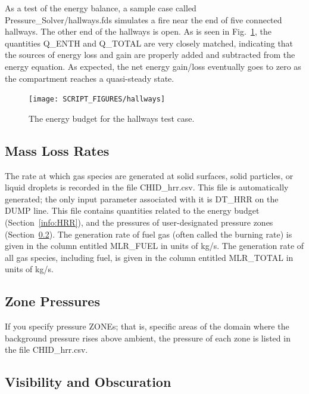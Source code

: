 \documentclass[11pt]{book}
\begin{document}
As a test of the energy balance, a sample case called {\ct Pressure\_Solver/hallways.fds} simulates a fire near the end of five connected hallways. The other end of the hallways is open. As is seen in Fig.~\ref{hallways_energy}, the quantities {\ct Q\_ENTH} and {\ct Q\_TOTAL} are very closely matched, indicating that the sources of energy loss and gain are properly added and subtracted from the energy equation. As expected, the net energy gain/loss eventually goes to zero as the compartment reaches a quasi-steady state.
\begin{figure}[ht]
\centering
\texttt{[image: SCRIPT\_FIGURES/hallways]}
\caption[Results of the {\ct hallways} test case]{The energy budget for the {\ct hallways} test case.}
\label{hallways_energy}
\end{figure}


\subsection{Mass Loss Rates}

The rate at which gas species are generated at solid surfaces, solid particles, or liquid droplets is recorded in the file {\ct CHID\_hrr.csv}. This file is automatically generated; the only input parameter associated with it is {\ct DT\_HRR} on the {\ct DUMP} line. This file contains quantities related to the energy budget (Section~\ref{info:HRR}), and the pressures of user-designated pressure zones (Section~\ref{info:pressurezone}). The generation rate of fuel gas (often called the burning rate) is given in the column entitled {\ct MLR\_FUEL} in units of kg/s. The generation rate of all gas species, including fuel, is given in the column entitled {\ct MLR\_TOTAL} in units of kg/s.


\subsection{Zone Pressures}
\label{info:pressurezone}

If you specify pressure {\ct ZONE}s; that is, specific areas of the domain where the background pressure rises above ambient, the pressure of each zone is listed in the file {\ct CHID\_hrr.csv}.


\subsection{Visibility and Obscuration}
\label{info:visibility}
\label{info:obscuration}
\end{document}
